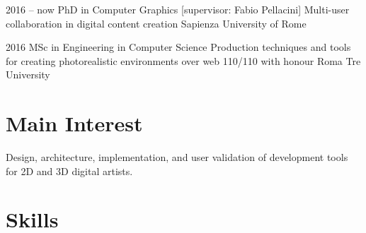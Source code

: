 \documentclass[10pt]{article} %
\begin{document}
\begin{paracol}{2}


\begin{supertabular}[rl]

	
	\item{2016 -- now} %
	{PhD in Computer Graphics} %
	{[supervisor: Fabio Pellacini] Multi-user collaboration in digital content creation} %
	{}
	{Sapienza University of Rome} %
	
	
	\item{2016} %
	{MSc in Engineering in Computer Science} %
	{Production techniques and tools for creating photorealistic environments over web} %
	{110/110 with honour}
	{Roma Tre University} %
	
\end{supertabular}


\section{Main Interest}

Design, architecture, implementation, and user validation of development tools for 2D and 3D digital artists.


\section{Skills}





\end{paracol}
\end{document}
